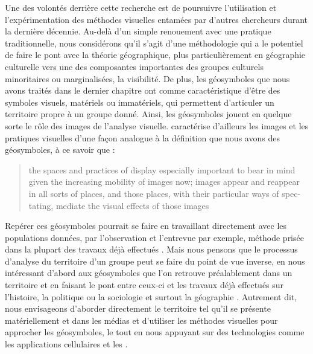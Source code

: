Une des volontés derrière cette recherche est de poursuivre l'utilisation et l'expérimentation des méthodes visuelles entamées par d'autres chercheurs durant la dernière décennie.
Au-delà d'un simple renouement avec une pratique traditionnelle, nous considérons qu'il s'agit d'une méthodologie qui a le potentiel de faire le pont avec la théorie géographique, plus particulièrement en géographie culturelle vers une des composantes importantes des groupes culturels minoritaires ou marginalisées, la visibilité.
De plus, les géosymboles que nous avons traités dans le dernier chapitre ont comme caractéristique d'être des symboles visuels, matériels ou immatériels, qui permettent d'articuler un territoire propre à un groupe donné.
Ainsi, les géosymboles jouent en quelque sorte le rôle des images de l'analyse visuelle.
\citeauthor{Rose2012} caractérise d'ailleurs les images et les pratiques visuelles d'une façon analogue à la définition que nous avons des géosymboles, à ce savoir que : \foreignblockquote{english}[{\cite[32]{Rose2012}}][.]{\textelp{} the spaces and practices of display  especially important to bear in mind given the increasing mobility of images now; images appear and reappear in all sorts of places, and those places, with their particular ways of spectating, mediate the visual effects of those images}.
Repérer ces géosymboles pourrait se faire en travaillant directement avec les populations données, par l'observation et l'entrevue par exemple, méthode prisée dans la plupart des travaux déjà effectués \citep[][pour ne citer que ceux-ci]{Giraud2014, Podmore2015a, Higgins1999}.
Mais nous pensons que le processus d'analyse du territoire d'un groupe peut se faire du point de vue inverse, en nous intéressant d'abord aux géosymboles que l'on retrouve préalablement dans un territoire et en faisant le pont entre ceux-ci et les travaux déjà effectués sur l'histoire, la politique ou la sociologie et surtout la géographie \lgbt.
Autrement dit, nous envisageons d'aborder directement le territoire tel qu'il se présente matériellement et dans les médias \lgbt{} et d'utiliser les méthodes visuelles pour approcher les géosymboles, le tout en nous appuyant sur des technologies comme les applications cellulaires et les \sig.


